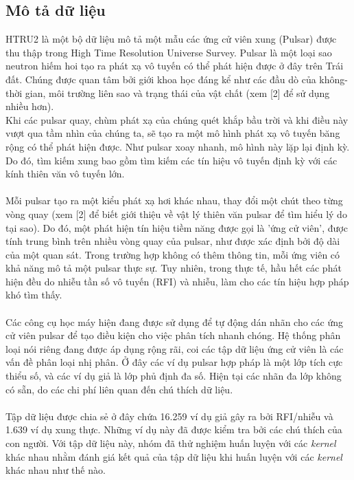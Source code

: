 \documentclass[a4paper, 12pt, oneside]{report}
\begin{document}
\subsection{Mô tả dữ liệu}
HTRU2 là một bộ dữ liệu mô tả một mẫu các ứng cử viên xung (Pulsar) được thu thập trong High Time Resolution Universe Survey. Pulsar là một loại sao neutron hiếm hoi tạo ra phát xạ vô tuyến có thể phát hiện được ở đây trên Trái đất. Chúng được quan tâm bởi giới  khoa học đáng kể như các đầu dò của không-thời gian, môi trường liên sao và trạng thái của vật chất (xem [2] để sử dụng nhiều hơn).\\
Khi các pulsar quay, chùm phát xạ của chúng quét khắp bầu trời và khi điều này vượt qua tầm nhìn của chúng ta, sẽ tạo ra một mô hình phát xạ vô tuyến băng rộng có thể phát hiện được. Như pulsar xoay nhanh, mô hình này lặp lại định kỳ. Do đó, tìm kiếm xung bao gồm tìm kiếm các tín hiệu vô tuyến định kỳ với các kính thiên văn vô tuyến lớn.\\ \\
Mỗi pulsar tạo ra một kiểu phát xạ hơi khác nhau, thay đổi một chút theo từng vòng quay (xem [2] để biết giới thiệu về vật lý thiên văn pulsar để tìm hiểu lý do tại sao). Do đó, một phát hiện tín hiệu tiềm năng được gọi là 'ứng cử viên', được tính trung bình trên nhiều vòng quay của pulsar, như được xác định bởi độ dài của một quan sát. Trong trường hợp không có thêm thông tin, mỗi ứng viên có khả năng mô tả một pulsar thực sự. Tuy nhiên, trong thực tế, hầu hết các phát hiện đều do nhiễu tần số vô tuyến (RFI) và nhiễu, làm cho các tín hiệu hợp pháp khó tìm thấy.\\ \\
Các công cụ học máy hiện đang được sử dụng để tự động dán nhãn cho các ứng cử viên pulsar để tạo điều kiện cho việc phân tích nhanh chóng. Hệ thống phân loại nói riêng đang được áp dụng rộng rãi, coi các tập dữ liệu ứng cử viên là các vấn đề phân loại nhị phân. Ở đây các ví dụ pulsar hợp pháp là một lớp tích cực thiểu số, và các ví dụ giả là lớp phủ định đa số. Hiện tại các nhãn đa lớp không có sẵn, do các chi phí liên quan đến chú thích dữ liệu.\\ \\
Tập dữ liệu được chia sẻ ở đây chứa 16.259 ví dụ giả gây ra bởi RFI/nhiễu và 1.639 ví dụ xung thực. Những ví dụ này đã được kiểm tra bởi các chú thích của con người. Với tập dữ liệu này, nhóm đã thử nghiệm huấn luyện với các \textit{kernel} khác nhau nhằm đánh giá kết quả của tập dữ liệu khi huấn luyện với các \textit{kernel} khác nhau như thế nào.
\end{document}
